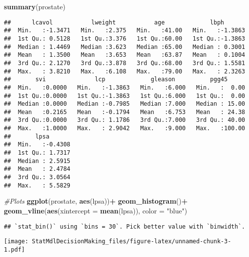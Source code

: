 \documentclass[
]{article}
\newenvironment{Shaded}{\begin{snugshade}}{\end{snugshade}}
\newcommand{\AttributeTok}[1]{\textcolor[rgb]{0.13,0.29,0.53}{#1}}
\newcommand{\CommentTok}[1]{\textcolor[rgb]{0.56,0.35,0.01}{\textit{#1}}}
\newcommand{\FunctionTok}[1]{\textcolor[rgb]{0.13,0.29,0.53}{\textbf{#1}}}
\newcommand{\NormalTok}[1]{#1}
\newcommand{\SpecialCharTok}[1]{\textcolor[rgb]{0.81,0.36,0.00}{\textbf{#1}}}
\newcommand{\StringTok}[1]{\textcolor[rgb]{0.31,0.60,0.02}{#1}}
\begin{document}
\begin{Shaded}
\begin{Highlighting}[]
  \FunctionTok{summary}\NormalTok{(prostate)}
\end{Highlighting}
\end{Shaded}

\begin{verbatim}
##      lcavol           lweight           age             lbph        
##  Min.   :-1.3471   Min.   :2.375   Min.   :41.00   Min.   :-1.3863  
##  1st Qu.: 0.5128   1st Qu.:3.376   1st Qu.:60.00   1st Qu.:-1.3863  
##  Median : 1.4469   Median :3.623   Median :65.00   Median : 0.3001  
##  Mean   : 1.3500   Mean   :3.653   Mean   :63.87   Mean   : 0.1004  
##  3rd Qu.: 2.1270   3rd Qu.:3.878   3rd Qu.:68.00   3rd Qu.: 1.5581  
##  Max.   : 3.8210   Max.   :6.108   Max.   :79.00   Max.   : 2.3263  
##       svi              lcp             gleason          pgg45       
##  Min.   :0.0000   Min.   :-1.3863   Min.   :6.000   Min.   :  0.00  
##  1st Qu.:0.0000   1st Qu.:-1.3863   1st Qu.:6.000   1st Qu.:  0.00  
##  Median :0.0000   Median :-0.7985   Median :7.000   Median : 15.00  
##  Mean   :0.2165   Mean   :-0.1794   Mean   :6.753   Mean   : 24.38  
##  3rd Qu.:0.0000   3rd Qu.: 1.1786   3rd Qu.:7.000   3rd Qu.: 40.00  
##  Max.   :1.0000   Max.   : 2.9042   Max.   :9.000   Max.   :100.00  
##       lpsa        
##  Min.   :-0.4308  
##  1st Qu.: 1.7317  
##  Median : 2.5915  
##  Mean   : 2.4784  
##  3rd Qu.: 3.0564  
##  Max.   : 5.5829
\end{verbatim}

\begin{Shaded}
\begin{Highlighting}[]
    \CommentTok{\#Plots}
    \FunctionTok{ggplot}\NormalTok{(prostate, }\FunctionTok{aes}\NormalTok{(lpsa))}\SpecialCharTok{+}
        \FunctionTok{geom\_histogram}\NormalTok{()}\SpecialCharTok{+}
        \FunctionTok{geom\_vline}\NormalTok{(}\FunctionTok{aes}\NormalTok{(}\AttributeTok{xintercept =} \FunctionTok{mean}\NormalTok{(lpsa)), }\AttributeTok{color =} \StringTok{"blue"}\NormalTok{)}
\end{Highlighting}
\end{Shaded}

\begin{verbatim}
## `stat_bin()` using `bins = 30`. Pick better value with `binwidth`.
\end{verbatim}

\texttt{[image: StatMdlDecisionMaking\_files/figure-latex/unnamed-chunk-3-1.pdf]}
\end{document}
